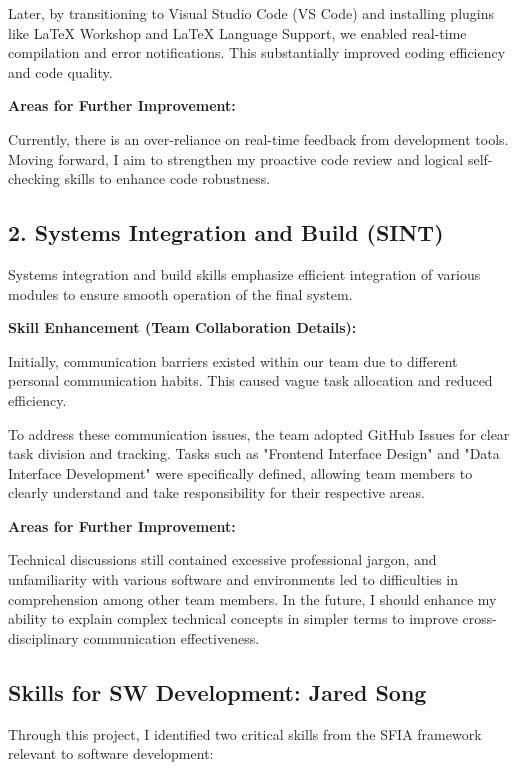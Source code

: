 \documentclass[a4paper, 11pt]{report}
\begin{document}
Later, by transitioning to Visual Studio Code (VS Code) and installing plugins like LaTeX Workshop and LaTeX Language Support, we enabled real-time compilation and error notifications. This substantially improved coding efficiency and code quality.

\textbf{Areas for Further Improvement:}

Currently, there is an over-reliance on real-time feedback from development tools. Moving forward, I aim to strengthen my proactive code review and logical self-checking skills to enhance code robustness.

\subsection*{2. Systems Integration and Build (SINT)}

Systems integration and build skills emphasize efficient integration of various modules to ensure smooth operation of the final system.

\textbf{Skill Enhancement (Team Collaboration Details):}

Initially, communication barriers existed within our team due to different personal communication habits. This caused vague task allocation and reduced efficiency.

To address these communication issues, the team adopted GitHub Issues for clear task division and tracking. Tasks such as "Frontend Interface Design" and "Data Interface Development" were specifically defined, allowing team members to clearly understand and take responsibility for their respective areas.

\textbf{Areas for Further Improvement:}

Technical discussions still contained excessive professional jargon, and unfamiliarity with various software and environments led to difficulties in comprehension among other team members. In the future, I should enhance my ability to explain complex technical concepts in simpler terms to improve cross-disciplinary communication effectiveness.

\subsection{Skills for SW Development: Jared Song}
Through this project, I identified two critical skills from the SFIA framework relevant to software development:
\end{document}
